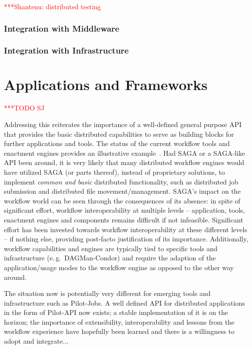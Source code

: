 \documentclass[a4paper,10pt]{article}
\newcommand{\todo}[1]{     {\textcolor{red}  { ***TODO      #1 }}}
\newcommand{\jhanote}[1]{  {\textcolor{red}  { ***Shantenu: #1 }}}
\newcommand{\todo}[1]{}
\newcommand{\jhanote}[1]{}
\begin{document}
\jhanote{distributed testing}

\subsubsection{Integration with Middleware}
\subsubsection{Integration with Infrastructure}


\section{Applications and Frameworks}\todo{SJ}
\label{apps_and_frameworks}


Addressing this reiterates the importance of a well-defined general
purpose API that provides the basic distributed capabilities to serve
as building blocks for further applications and tools. The status of
the current workflow tools and enactment engines provides an
illustrative example~\cite{nsf-workflow,1196459}. Had SAGA or a
SAGA-like API been around, it is very likely that many distributed
workflow engines would have utilized SAGA (or parts thereof), instead
of proprietary solutions, to implement {\it common and basic}
distributed functionality, such as distributed job submission and
distributed file movement/management. SAGA's impact on the workflow
world can be seen through the consequences of its absence: in spite of
significant effort, workflow interoperability at multiple levels --
application, tools, enactment engines and components remains difficult
if not infeasible.  Significant effort has been invested towards
workflow interoperability at these different levels -- if nothing
else, providing post-facto justification of its importance.
Additionally, workflow capabilities and engines are typically tied to
specific tools and infrastructure (e.\,g.\ DAGMan-Condor) and require
the adaption of the application/usage modes to the workflow engine as
opposed to the other way around.



The situation now is potentially very different for emerging tools and
infrastructure such as Pilot-Jobs. A well defined API for distributed
applications in the form of Pilot-API now exists; a stable
implementation of it is on the horizon; the importance of
extensibility, interoperability and lessons from the workflow
experience have hopefully been learned and there is a willingness to
adopt and integrate...
\end{document}
